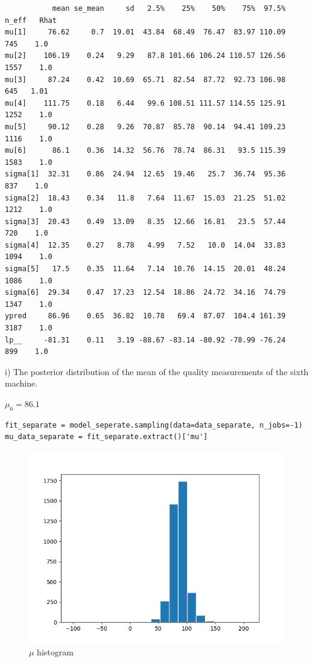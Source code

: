 \documentclass{article}
\begin{document}
\begin{verbatim}  
           mean se_mean     sd   2.5%    25%    50%    75%  97.5%  n_eff   Rhat
mu[1]     76.62     0.7  19.01  43.84  68.49  76.47  83.97 110.09    745    1.0
mu[2]    106.19    0.24   9.29   87.8 101.66 106.24 110.57 126.56   1557    1.0
mu[3]     87.24    0.42  10.69  65.71  82.54  87.72  92.73 106.98    645   1.01
mu[4]    111.75    0.18   6.44   99.6 108.51 111.57 114.55 125.91   1252    1.0
mu[5]     90.12    0.28   9.26  70.87  85.78  90.14  94.41 109.23   1116    1.0
mu[6]      86.1    0.36  14.32  56.76  78.74  86.31   93.5 115.39   1583    1.0
sigma[1]  32.31    0.86  24.94  12.65  19.46   25.7  36.74  95.36    837    1.0
sigma[2]  18.43    0.34   11.8   7.64  11.67  15.03  21.25  51.02   1212    1.0
sigma[3]  20.43    0.49  13.09   8.35  12.66  16.81   23.5  57.44    720    1.0
sigma[4]  12.35    0.27   8.78   4.99   7.52   10.0  14.04  33.83   1094    1.0
sigma[5]   17.5    0.35  11.64   7.14  10.76  14.15  20.01  48.24   1086    1.0
sigma[6]  29.34    0.47  17.23  12.54  18.86  24.72  34.16  74.79   1347    1.0
ypred     86.96    0.65  36.82  10.78   69.4  87.07  104.4 161.39   3187    1.0
lp__     -81.31    0.11   3.19 -88.67 -83.14 -80.92 -78.99 -76.24    899    1.0
\end{verbatim}

i) The posterior distribution of the mean of the quality measurements of the sixth machine.

$\mu_6=86.1$
\begin{verbatim}
fit_separate = model_seperate.sampling(data=data_separate, n_jobs=-1)
mu_data_separate = fit_separate.extract()['mu']
\end{verbatim}

\begin{figure}[H]
\centering  
\includegraphics[scale=0.5]{separate_hist_mu_six.png}
\caption{$\mu$ histogram}
\label{fig: label}
\end{figure}
\end{document}
